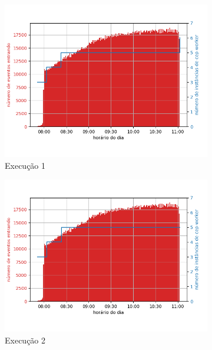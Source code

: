 \begin{figure}[p]
\begin{subfigure}{.5\textwidth}
  \centering
  \includegraphics[width=\linewidth]{figuras/graphics/carga_e_workers_horario6-dez-is.png}  
  \caption{Execução 1}
  \label{fig:cewh-6-dez-is}
\end{subfigure}
\begin{subfigure}{.5\textwidth}
  \centering
  \includegraphics[width=\linewidth]{figuras/graphics/carga_e_workers_horario7-dez-is.png}  
  \caption{Execução 2}
  \label{fig:cewh-7-dez-is}
\end{subfigure}
\begin{subfigure}{.5\textwidth}

\end{subfigure}
\end{figure}
